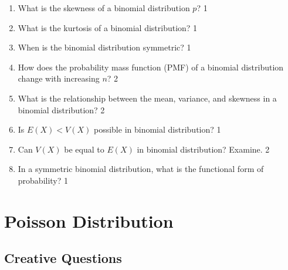 \documentclass[a4paper,oneside]{book}
\begin{document}
\begin{enumerate}
\item What is the skewness of a binomial distribution \( p \)? \hfill 1

\item What is the kurtosis of a binomial distribution? \hfill 1

\item When is the binomial distribution symmetric? \hfill 1

\item How does the probability mass function (PMF) of a binomial distribution change with increasing \( n \)? \hfill 2

\item What is the relationship between the mean, variance, and skewness in a binomial distribution? \hfill 2

\item Is $E(X) < V(X)$ possible in binomial distribution? \hfill 1

\item Can $V(X)$ be equal to $E(X)$ in binomial distribution? Examine. \hfill 2

\item In a symmetric binomial distribution, what is the functional form of probability? \hfill 1


 \end{enumerate}

\chapter{Poisson Distribution} 
\section{Creative Questions}
\end{document}
